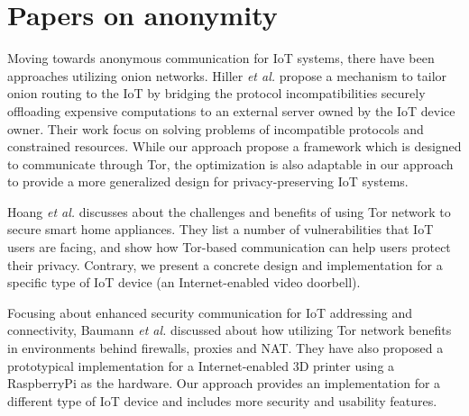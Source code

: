 \section{Papers on anonymity}

Moving towards anonymous communication for IoT systems, there have been approaches utilizing onion networks. Hiller \textit{et al.} \cite{hiller2019tailoring} propose a mechanism to tailor onion routing to the IoT by bridging the protocol incompatibilities securely offloading expensive computations to an external server owned by the IoT device owner. Their work focus on solving problems of incompatible protocols and constrained resources. While our approach propose a framework which is designed to communicate through Tor, the optimization is also adaptable in our approach to provide a more generalized design for privacy-preserving IoT systems.

Hoang \textit{et al.} \cite{hoang2015tor} discusses about the challenges and benefits of using Tor network to secure smart home appliances. They list a number of vulnerabilities that IoT users are facing, and show how Tor-based communication can help users protect their privacy. Contrary, we present a concrete design and implementation for a specific type of IoT device (an Internet-enabled video doorbell).

Focusing about enhanced security communication for IoT addressing and connectivity, Baumann \textit{et al.} \cite{baumann2018utilising} discussed about how utilizing Tor network benefits in environments behind firewalls, proxies and NAT. They have also proposed a prototypical implementation for a Internet-enabled 3D printer using a RaspberryPi as the hardware. Our approach provides an implementation for a different type of IoT device and includes more security and usability features.
